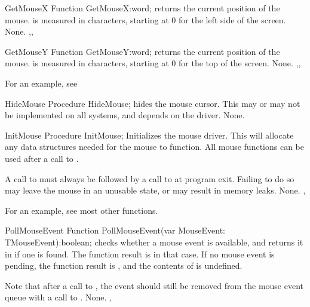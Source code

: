 \begin{function}{GetMouseX}
\Declaration
Function GetMouseX:word;
\Description
{} returns the current  position of the mouse.  is
measured in characters, starting at 0 for the left side of the screen.
\Errors
None.
\SeeAlso
{},, 
\end{function}


\begin{function}{GetMouseY}
\Declaration
Function GetMouseY:word; 
\Description
{} returns the current  position of the mouse.  is
measured in characters, starting at 0 for the top of the screen.
\Errors
None.
\SeeAlso
{},, 
\end{function}

For an example, see 

\begin{procedure}{HideMouse}
\Declaration
Procedure HideMouse;
\Description
{} hides the mouse cursor. This may or may not be implemented
on all systems, and depends on the driver.
\Errors
None.
\SeeAlso
{}
\end{procedure}


\begin{procedure}{InitMouse}
\Declaration
Procedure InitMouse;
\Description
{} Initializes the mouse driver. This will allocate any data
structures needed for the mouse to function. All mouse functions can be
used after a call to .

A call to  must always be followed by a call to 
at program exit. Failing to do so may leave the mouse in an unusable state,
or may result in memory leaks.
\Errors
None.
\SeeAlso
{}, 
\end{procedure}

For an example, see most other functions.

\begin{function}{PollMouseEvent}
\Declaration
Function PollMouseEvent(var MouseEvent: TMouseEvent):boolean; 
\Description
{} checks whether a mouse event is available, and 
returns it in  if one is found. The function result is
 in that case. If no mouse event is pending, the function result
is , and the contents of  is undefined.

Note that after a call to , the event should still 
be removed from the mouse event queue with a call to .
\Errors
None.
\SeeAlso
{}, 
\end{function}

